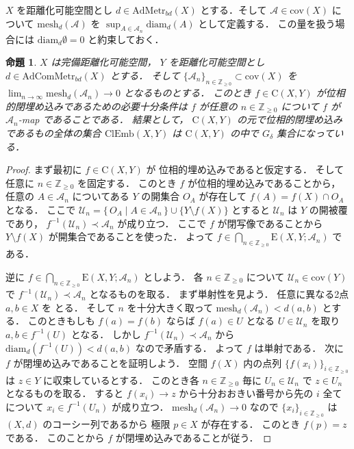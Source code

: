 \documentclass[leqno, a4paper, 12pt]{jsarticle}
\numberwithin{equation}{section}
\newtheorem{prop}[thm]{命題}
\newcommand{\zz}{\mathbb{Z}}
\newcommand{\yocov}[1]{\mathrm{cov}(#1)}
\newcommand{\yocovfont}[1]{\mathscr{#1}}
\newcommand{\yofine}{\prec}
\newcommand{\yomapl}[2]{\mathrm{C}(#1, #2)}
\newcommand{\yocbamet}[1]{\mathrm{AdMetr}_{bd}(#1)}
\newcommand{\yocbacmet}[1]{\mathrm{AdComMetr}_{bd}(#1)}
\newcommand{\yodiam}{\mathrm{diam}}
\newcommand{\yoemb}[2]{\mathrm{ClEmb}(#1, #2)}
\newcommand{\yocmaps}[3]{\mathrm{E}(#1, #2; #3)}
\newcommand{\yomesh}{\mathrm{mesh}}
\begin{document}
$X$
を距離化可能空間とし
$d\in \yocbamet{X}$
とする．そして
$\yocovfont{A}\in \yocov{X}$
について
$\yomesh_{d}(\yocovfont{A})$
を
$\sup_{A\in \yocovfont{A}_{n}}\yodiam_{d}(A)$
として定義する．
この量を扱う場合には
$\yodiam_{d}\emptyset=0$
と約束しておく．
\begin{prop}\label{prop:clembeddings}
$X$
は完備距離化可能空間，
$Y$
を距離化可能空間とし
$d \in \yocbacmet{X}$
とする．
そして
$\{\yocovfont{A}_{n}\}_{n\in \zz_{\ge 0}}\subset \yocov{X}$
を
$\lim_{n\to \infty}\yomesh_{d}(\yocovfont{A}_{n})\to 0$
となるものとする．
このとき
$f\in \yomapl{X}{Y}$
が位相的閉埋め込みであるための必要十分条件は
$f$
が任意の
$n\in \zz_{\ge 0}$
について
$f$
が
$\yocovfont{A}_{n}$-map
であることである．
結果として，
$\yomapl{X}{Y}$
の元で位相的閉埋め込みであるもの全体の集合
$\yoemb{X}{Y}$
は
$\yomapl{X}{Y}$
の中で
$G_{\delta}$
集合になっている．
\end{prop}
\begin{proof}
まず最初に
$f\in \yomapl{X}{Y}$
が
位相的埋め込みであると仮定する．
そして任意に
$n\in \zz_{\ge 0}$
を固定する．
このとき
$f$
が位相的埋め込みであることから，
任意の
$A\in \yocovfont{A}_{n}$
についてある
$Y$
の開集合
$O_{A}$
が存在して
$f(A)=f(X)\cap O_{A}$
となる．
ここで
$\yocovfont{U}_{n}=\{\, O_{A}\mid A\in \yocovfont{A}_{n}\, \}\cup \{Y\setminus f(X)\}$
とすると
$\yocovfont{U}_{n}$
は
$Y$
の開被覆であり，
$f^{-1}(\yocovfont{U}_{n})\yofine\yocovfont{A}_{n}$
が成り立つ．
ここで
$f$
が閉写像であることから
$Y\setminus f(X)$
が開集合であることを使った．
よって
$f\in \bigcap_{n\in \zz_{\ge 0}}\yocmaps{X}{Y}{\yocovfont{A}_{n}}$
である．

逆に
$f\in \bigcap_{n\in \zz_{\ge 0}}\yocmaps{X}{Y}{\yocovfont{A}_{n}}$
としよう．
各
$n\in \zz_{\ge 0}$
について
$\yocovfont{U}_{n}\in \yocov{Y}$
で
$f^{-1}(\yocovfont{U}_{n})\yofine \yocovfont{A}_{n}$
となるものを取る．
まず単射性を見よう．
任意に異なる2点
$a, b\in X$
を
とる．
そして
$n$
を十分大きく取って
$\yomesh_{d}(\yocovfont{A}_{n})<d(a, b)$
とする．
このときもしも
$f(a)=f(b)$
ならば
$f(a)\in U$
となる
$U\in \yocovfont{U}_{n}$
を取り
$a, b\in f^{-1}(U)$
となる．
しかし
$f^{-1}(\yocovfont{U}_{n})\yofine \yocovfont{A}_{n}$
から
$\yodiam_{d}(f^{-1}(U))<d(a,b)$
なので矛盾する．
よって
$f$
は単射である．
次に
$f$
が閉埋め込みであることを証明しよう．
空間
$f(X)$
内の点列
$\{f(x_{i})\}_{i\in \zz_{\ge 0}}$
は
$z\in Y$
に収束しているとする．
このとき各
$n\in \zz_{\ge 0}$
毎に
$U_{n}\in \yocovfont{U}_{n}$
で
$z\in U_{n}$
となるものを取る．
すると
$f(x_{i})\to z$
から十分おおきい番号から先の
$i$
全てについて
$x_{i}\in  f^{-1}(U_{n})$
が成り立つ．
$\yomesh_{d}(\yocovfont{A}_{n})\to 0$
なので
$\{x_{i}\}_{i\in \zz_{\ge 0}}$
は
$(X, d)$
のコーシー列であるから
極限
$p\in X$
が存在する．
このとき
$f(p)=z$
である．
このことから
$f$
が閉埋め込みであることが従う．
\end{proof}
\end{document}
